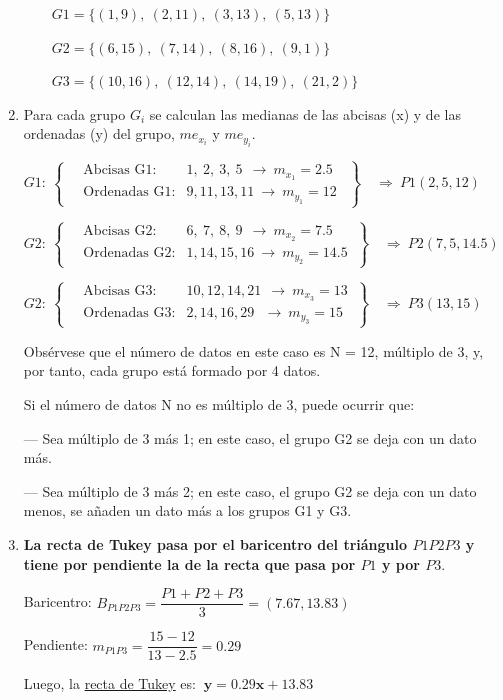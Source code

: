 \begin{example}
\begin{enumerate}
$\qquad G1=\{(1,9),\ (2,11),\ (3,13),\ (5,13) \}$

$\qquad G2=\{(6,15),\ (7,14),\ (8,16),\ (9,1) \}$

$\qquad G3=\{(10,16),\ (12,14),\ (14,19),\ (21,2) \}$



\item Para cada grupo $G_i$ se calculan las medianas de las abcisas (x) y de las ordenadas (y) del grupo, $me_{x_i}$ y $me_{y_i}$.


$G1: \ \left.
\begin{cases}
\quad \text{Abcisas   G1:} & 1,\ 2,\ 3,\ 5 \ \ \to \ m_{x_1}=2.5	 \ 
\\
\quad \text{Ordenadas G1:} & 9, 11, 13, 11 \ \to \ m_{y_1}=12	\ 
\end{cases} \ \right\}  \quad  \Rightarrow \ P1(2,5,12) $

$G2: \ \left.
\begin{cases}
\quad \text{Abcisas   G2:} & 6,\ 7,\ 8,\ 9 \ \ \to \ m_{x_2}=7.5	
\\
\quad \text{Ordenadas G2:} & 1, 14, 15, 16 \ \to \ m_{y_2}=14.5	
\end{cases} \ \right\}  \quad  \Rightarrow \ P2(7,5,14.5) $

$G2: \ \left.
\begin{cases}
\quad \text{Abcisas   G3:} & 10, 12, 14, 21 \ \ \to \ m_{x_3}=13 	
\\
\quad \text{Ordenadas G3:} & 2, 14, 16, 29 \ \ \ \to \ m_{y_3}=15	
\end{cases} \ \right\}  \quad  \Rightarrow \  P3(13,15) $

\vspace{2mm} Obsérvese que el número de datos en este caso es N = 12, múltiplo de 3, y, por tanto, cada grupo está formado por 4 datos. 

\vspace{2mm} Si el número de datos N no es múltiplo de 3, puede ocurrir que:

--- Sea múltiplo de 3 más 1; en este caso, el grupo G2 se deja con un dato más.

--- Sea múltiplo de 3 más 2; en este caso, el grupo G2 se deja con un dato menos, se añaden un dato más a los grupos G1 y G3.

\item \textbf{La recta de Tukey pasa por el baricentro del triángulo $P1P2P3$ y tiene por pendiente la de la recta que pasa por $P1$ y por $P3$}.

\vspace{2mm}  Baricentro: $B_{P1P2P3}=\dfrac{P1+P2+P3}{3}=(7.67,13.83)$

\vspace{2mm}  Pendiente: $m_{P1P3}=\dfrac{15-12}{13-2.5}=0.29$

\vspace{2mm}  Luego, la \underline{recta de Tukey} es: $\ \boldsymbol{y=0.29x+13.83}$

\end{enumerate}
\end{example}



